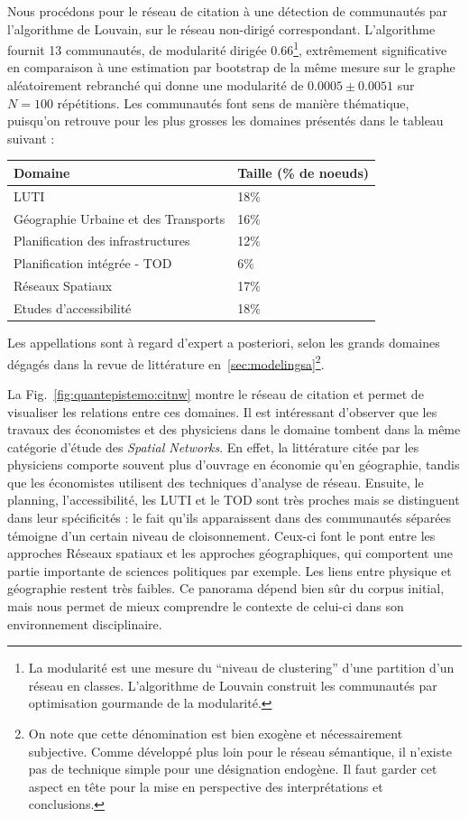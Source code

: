 Nous procédons pour le réseau de citation à une détection de communautés par l'algorithme de Louvain, sur le réseau non-dirigé correspondant. L'algorithme fournit 13 communautés, de modularité dirigée 0.66\footnote{La modularité est une mesure du ``niveau de clustering'' d'une partition d'un réseau en classes. L'algorithme de Louvain construit les communautés par optimisation gourmande de la modularité.}, extrêmement significative en comparaison à une estimation par bootstrap de la même mesure sur le graphe aléatoirement rebranché qui donne une modularité de $0.0005 \pm 0.0051$ sur $N=100$ répétitions. Les communautés font sens de manière thématique, puisqu'on retrouve pour les plus grosses les domaines présentés dans le tableau suivant :

\medskip
\begin{center}
\begin{tabular}{|l|l|}
\hline
	Domaine & Taille (\% de noeuds)\\\hline
	LUTI & 18\% \\\hline
	Géographie Urbaine et des Transports & 16\% \\\hline
	Planification des infrastructures & 12\% \\\hline
	Planification intégrée - TOD & 6\% \\\hline
	Réseaux Spatiaux & 17\% \\\hline
	Etudes d'accessibilité & 18\% \\\hline
\end{tabular}
\end{center}
\medskip

Les appellations sont à regard d'expert a posteriori, selon les grands domaines dégagés dans la revue de littérature en~\ref{sec:modelingsa}\footnote{On note que cette dénomination est bien exogène et nécessairement subjective. Comme développé plus loin pour le réseau sémantique, il n'existe pas de technique simple pour une désignation endogène. Il faut garder cet aspect en tête pour la mise en perspective des interprétations et conclusions.}.


La Fig.~\ref{fig:quantepistemo:citnw} montre le réseau de citation et permet de visualiser les relations entre ces domaines. Il est intéressant d'observer que les travaux des économistes et des physiciens dans le domaine tombent dans la même catégorie d'étude des \emph{Spatial Networks}. En effet, la littérature citée par les physiciens comporte souvent plus d'ouvrage en économie qu'en géographie, tandis que les économistes utilisent des techniques d'analyse de réseau. Ensuite, le planning, l'accessibilité, les LUTI et le TOD sont très proches mais se distinguent dans leur spécificités : le fait qu'ils apparaissent dans des communautés séparées témoigne d'un certain niveau de cloisonnement. Ceux-ci font le pont entre les approches Réseaux spatiaux et les approches géographiques, qui comportent une partie importante de sciences politiques par exemple. Les liens entre physique et géographie restent très faibles. Ce panorama dépend bien sûr du corpus initial, mais nous permet de mieux comprendre le contexte de celui-ci dans son environnement disciplinaire.


